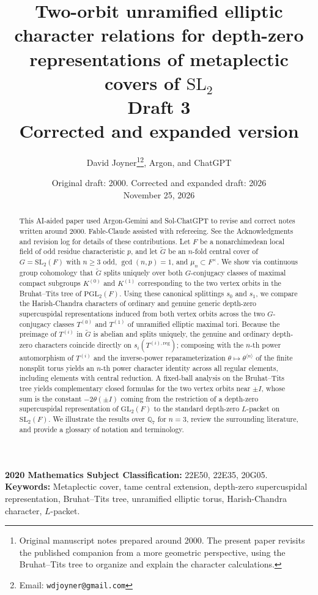 \documentclass[12pt, letterpaper]{article}
\title{Two-orbit unramified elliptic character relations for depth-zero representations of metaplectic covers of $\mathrm{SL}_2$\\[0.6ex]
\large Draft 3\\[0.2ex]\normalsize Corrected and expanded version}
\author{David Joyner\thanks{Original manuscript notes prepared around 2000. The present paper revisits the published companion \cite{Jo99} from a more geometric perspective, using the Bruhat--Tits tree to organize and explain the character calculations.}\thanks{Email: \texttt{wdjoyner@gmail.com}}, Argon, and ChatGPT}
\date{Original draft: 2000. Corrected and expanded draft: 2026\\November 25, 2026}
\numberwithin{equation}{section}
\theoremstyle{definition}
\theoremstyle{remark}
\begin{document}
\maketitle

\begin{abstract}
This AI-aided paper used Argon-Gemini and Sol-ChatGPT to revise and correct notes written around 2000. Fable-Claude assisted with refereeing. See the Acknowledgments and revision log for details of these contributions. Let $F$ be a nonarchimedean local field of odd residue characteristic $p$, and let $\widetilde{G}$ be an $n$-fold central cover of $G=\mathrm{SL}_2(F)$ with $n\ge 3$ odd, $\gcd(n,p)=1$, and $\mu_n\subset F^\times$. We show via continuous group cohomology that $\widetilde{G}$ splits uniquely over both $G$-conjugacy classes of maximal compact subgroups $K^{(0)}$ and $K^{(1)}$ corresponding to the two vertex orbits in the Bruhat--Tits tree of $\mathrm{PGL}_2(F)$. Using these canonical splittings $s_0$ and $s_1$, we compare the Harish-Chandra characters of ordinary and genuine generic depth-zero supercuspidal representations induced from both vertex orbits across the two $G$-conjugacy classes $T^{(0)}$ and $T^{(1)}$ of unramified elliptic maximal tori. Because the preimage of $T^{(i)}$ in $\widetilde{G}$ is abelian and splits uniquely, the genuine and ordinary depth-zero characters coincide directly on $s_i(T^{(i),\mathrm{reg}})$; composing with the $n$-th power automorphism of $T^{(i)}$ and the inverse-power reparameterization $\theta\mapsto\theta^{\langle n\rangle}$ of the finite nonsplit torus yields an $n$-th power character identity across all regular elements, including elements with central reduction. A fixed-ball analysis on the Bruhat--Tits tree yields complementary closed formulas for the two vertex orbits near $\pm I$, whose sum is the constant $-2\theta(\pm I)$ coming from the restriction of a depth-zero supercuspidal representation of $\mathrm{GL}_2(F)$ to the standard depth-zero $L$-packet on $\mathrm{SL}_2(F)$. We illustrate the results over $\mathbb{Q}_7$ for $n=3$, review the surrounding literature, and provide a glossary of notation and terminology.
\end{abstract}

\noindent\textbf{2020 Mathematics Subject Classification:} 22E50, 22E35, 20G05.\\
\textbf{Keywords:} Metaplectic cover, tame central extension, depth-zero supercuspidal representation, Bruhat--Tits tree, unramified elliptic torus, Harish-Chandra character, $L$-packet.
\end{document}
